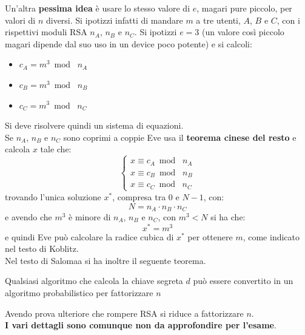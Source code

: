 \documentclass[a4paper,12pt, oneside]{book}
\begin{document}
Un'altra \textbf{pessima idea} è usare lo stesso valore di $e$, magari pure
piccolo, per valori di $n$ diversi. Si ipotizzi infatti di mandare $m$ a tre
utenti, $A$, $B$ e $C$, con i rispettivi moduli RSA $n_A$, $n_B$ e $n_C$. Si
ipotizzi $e=3$ (un valore così piccolo magari dipende dal suo uso in un device
poco potente) e si calcoli:
\begin{itemize}
  \item $c_A=m^3\bmod \,\,n_A$
  \item $c_B=m^3\bmod \,\,n_B$
  \item $c_C=m^3\bmod \,\,n_C$
\end{itemize}
Si deve risolvere quindi un sistema di equazioni.\\
Se $n_A$, $n_B$ e $n_C$ sono coprimi a coppie Eve usa il \textbf{teorema cinese
  del resto} e calcola $x$ tale che:
\[
  \begin{cases}
    x\equiv c_A\bmod\,\,n_A\\
    x\equiv c_B\bmod\,\,n_B\\
    x\equiv c_C\bmod\,\,n_C  
  \end{cases}
\]
trovando l'unica soluzione $x^*$, compresa tra 0 e $N-1$, con:
\[N=n_A\cdot n_B\cdot n_C\]
e avendo che $m^3$ è minore di $n_A$, $n_B$ e $n_C$, con $m^3<N$ si ha che:
\[x^*=m^3\]
e quindi Eve può calcolare la radice cubica di $x^*$ per ottenere $m$, come
indicato nel testo di Koblitz.\\
Nel testo di Salomaa si ha inoltre il seguente teorema.
\begin{teorema}
  Qualsiasi algoritmo che calcola la chiave segreta $d$ può essere convertito in
  un algoritmo probabilistico per fattorizzare $n$ 
\end{teorema}
Avendo prova ulteriore che rompere RSA si riduce a fattorizzare $n$.\\
\textbf{I vari dettagli sono comunque non da approfondire per l'esame}.
\end{document}
